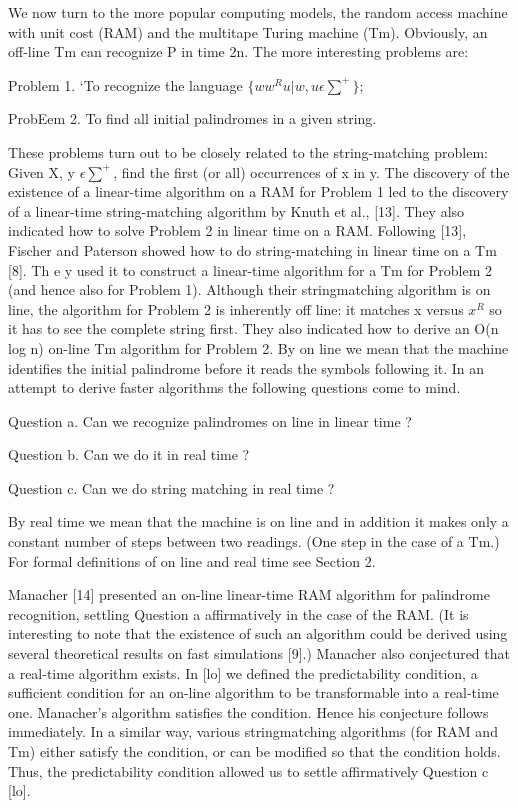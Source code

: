 \documentclass[11pt,a4paper]{report}
\begin{document}
We now turn to the more popular computing models, the random access machine
with unit cost (RAM) and the multitape Turing machine (Tm). Obviously, an off-line
Tm can recognize P in time 2n. The more interesting problems are:

Problem 1. ‘To recognize the language $\{ww^{R}u | w, u \epsilon \sum^{+}\}$;

ProbEem 2. To find all initial palindromes in a given string.

These problems turn out to be closely related to the string-matching problem: Given X,
y $ \epsilon \sum^{+}$, find the first (or all) occurrences of x in y. The discovery of the existence of a
linear-time algorithm on a RAM for Problem 1 led to the discovery of a linear-time
string-matching algorithm by Knuth et al., [13]. They also indicated how to solve
Problem 2 in linear time on a RAM. Following [13], Fischer and Paterson showed how
to do string-matching in linear time on a Tm [8]. Th e y used it to construct a linear-time
algorithm for a Tm for Problem 2 (and hence also for Problem 1). Although their stringmatching algorithm is on line, the algorithm for Problem 2 is inherently off line: it
matches x versus $x^R$ so it has to see the complete string first. They also indicated how to
derive an O(n log n) on-line Tm algorithm for Problem 2. By on line we mean that the
machine identifies the initial palindrome before it reads the symbols following it. In an
attempt to derive faster algorithms the following questions come to mind.

Question a. Can we recognize palindromes on line in linear time ?

Question b. Can we do it in real time ?

Question c. Can we do string matching in real time ? 

By real time we mean that the machine is on line and in addition it makes only a
constant number of steps between two readings. (One step in the case of a Tm.) For
formal definitions of on line and real time see Section 2.

Manacher [14] presented an on-line linear-time RAM algorithm for palindrome
recognition, settling Question a affirmatively in the case of the RAM. (It is interesting
to note that the existence of such an algorithm could be derived using several theoretical
results on fast simulations [9].) Manacher also conjectured that a real-time algorithm
exists. In [lo] we defined the predictability condition, a sufficient condition for an on-line
algorithm to be transformable into a real-time one. Manacher’s algorithm satisfies the
condition. Hence his conjecture follows immediately. In a similar way, various stringmatching algorithms (for RAM and Tm) either satisfy the condition, or can be modified
so that the condition holds. Thus, the predictability condition allowed us to settle
affirmatively Question c [lo].
\end{document}

